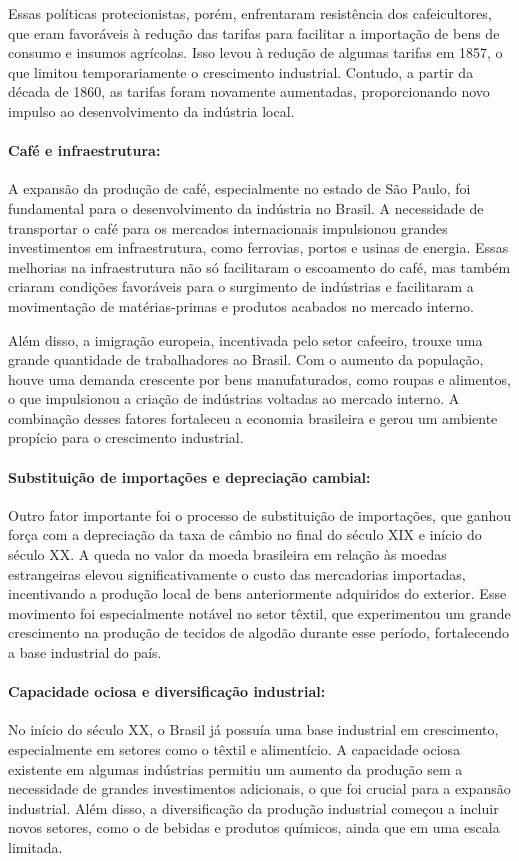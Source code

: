 \documentclass[a4paper,12pt]{article}[abntex2]
\begin{document}
Essas políticas protecionistas, porém, enfrentaram resistência dos cafeicultores, que eram favoráveis à redução das tarifas para facilitar a importação de bens de consumo e insumos agrícolas. Isso levou à redução de algumas tarifas em 1857, o que limitou temporariamente o crescimento industrial. Contudo, a partir da década de 1860, as tarifas foram novamente aumentadas, proporcionando novo impulso ao desenvolvimento da indústria local.

\paragraph{Café e infraestrutura:}
A expansão da produção de café, especialmente no estado de São Paulo, foi fundamental para o desenvolvimento da indústria no Brasil. A necessidade de transportar o café para os mercados internacionais impulsionou grandes investimentos em infraestrutura, como ferrovias, portos e usinas de energia. Essas melhorias na infraestrutura não só facilitaram o escoamento do café, mas também criaram condições favoráveis para o surgimento de indústrias e facilitaram a movimentação de matérias-primas e produtos acabados no mercado interno.

Além disso, a imigração europeia, incentivada pelo setor cafeeiro, trouxe uma grande quantidade de trabalhadores ao Brasil. Com o aumento da população, houve uma demanda crescente por bens manufaturados, como roupas e alimentos, o que impulsionou a criação de indústrias voltadas ao mercado interno. A combinação desses fatores fortaleceu a economia brasileira e gerou um ambiente propício para o crescimento industrial.

\paragraph{Substituição de importações e depreciação cambial:}
Outro fator importante foi o processo de substituição de importações, que ganhou força com a depreciação da taxa de câmbio no final do século XIX e início do século XX. A queda no valor da moeda brasileira em relação às moedas estrangeiras elevou significativamente o custo das mercadorias importadas, incentivando a produção local de bens anteriormente adquiridos do exterior. Esse movimento foi especialmente notável no setor têxtil, que experimentou um grande crescimento na produção de tecidos de algodão durante esse período, fortalecendo a base industrial do país.

\paragraph{Capacidade ociosa e diversificação industrial:}
No início do século XX, o Brasil já possuía uma base industrial em crescimento, especialmente em setores como o têxtil e alimentício. A capacidade ociosa existente em algumas indústrias permitiu um aumento da produção sem a necessidade de grandes investimentos adicionais, o que foi crucial para a expansão industrial. Além disso, a diversificação da produção industrial começou a incluir novos setores, como o de bebidas e produtos químicos, ainda que em uma escala limitada.
\end{document}

